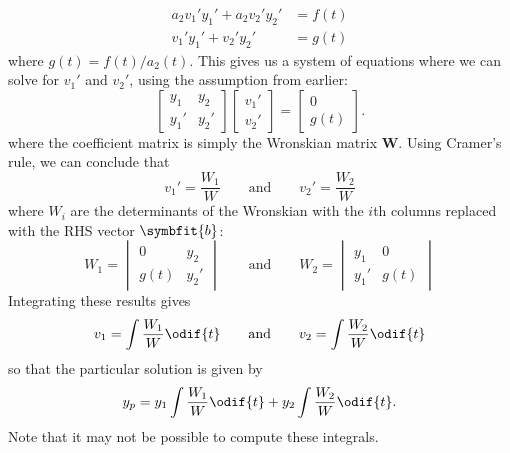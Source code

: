\documentclass{article}
\begin{document}
\begin{appendix}
\begin{align*}
        a_2 v_1' y_1' + a_2 v_2' y_2'                                                                                                                    & = f\left( t \right) \\
        v_1' y_1' + v_2' y_2'                                                                                                                            & = g\left( t \right)
    \end{align*}
    where \(g\left( t \right) = f\left( t \right) / a_2\left( t \right)\).
    This gives us a system of equations where we can solve for \(v_1'\) and \(v_2'\),
    using the assumption from earlier:
    \begin{equation*}
        \begin{bmatrix}
            y_1  & y_2  \\
            y_1' & y_2'
        \end{bmatrix}
        \begin{bmatrix}
            v_1' \\
            v_2'
        \end{bmatrix}
        =
        \begin{bmatrix}
            0 \\
            g\left( t \right)
        \end{bmatrix}.
    \end{equation*}
    where the coefficient matrix is simply the Wronskian matrix \(\symbf{W}\).
    Using Cramer's rule, we can conclude that
    \begin{equation*}
        v_1' = \frac{W_1}{W} \qquad \text{and} \qquad v_2' = \frac{W_2}{W}
    \end{equation*}
    where \(W_i\) are the determinants of the Wronskian with the \(i\)th columns replaced with the RHS vector \(\symbfit{b}\):
    \begin{equation*}
        W_1 = \begin{vmatrix}
            0                 & y_2  \\
            g\left( t \right) & y_2'
        \end{vmatrix}
        \qquad \text{and} \qquad
        W_2 = \begin{vmatrix}
            y_1  & 0                 \\
            y_1' & g\left( t \right)
        \end{vmatrix}
    \end{equation*}
    Integrating these results gives
    \begin{equation*}
        v_1 = \int \frac{W_1}{W} \odif{t} \qquad \text{and} \qquad v_2 = \int \frac{W_2}{W} \odif{t}
    \end{equation*}
    so that the particular solution is given by
    \begin{equation*}
        y_p = y_1 \int \frac{W_1}{W} \odif{t} + y_2 \int \frac{W_2}{W} \odif{t}.
    \end{equation*}
    Note that it may not be possible to compute these integrals.
\end{appendix}
\end{document}
